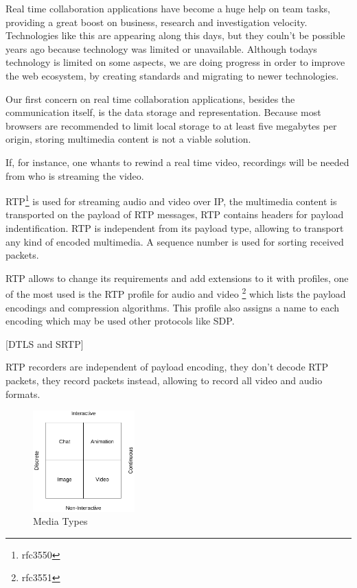 
 	Real time collaboration applications have become a huge help on team tasks, providing a great boost on business, research and investigation velocity. Technologies like this are appearing along this days, but they couln't be possible years ago because technology was limited or unavailable. Although todays technology is limited on some aspects, we are doing progress in order to improve the web ecosystem, by creating standards and migrating to newer technologies.

 	Our first concern on real time collaboration applications, besides the communication itself, is the data storage and representation. Because most browsers are recommended to limit local storage to at least five megabytes per origin, storing multimedia content is not a viable solution.

	If, for instance, one whants to rewind a real time video, recordings will be needed from who is streaming the video. 

  \ac{RTP}\footnote{rfc3550} is used for streaming audio and video over \ac{IP}, the multimedia content is transported on the payload of \ac{RTP} messages, \ac{RTP} contains headers for payload indentification. \ac{RTP} is independent from its payload type, allowing to transport any kind of encoded multimedia. A sequence number is used for sorting received packets.

  \ac{RTP} allows to change its requirements and add extensions to it with profiles, one of the most used is the \ac{RTP} profile for audio and video \footnote{rfc3551} which lists the payload encodings and compression algorithms. This profile also assigns a name to each encoding which may be used other protocols like \ac{SDP}.

  {\color{red}[DTLS and SRTP]}

  \ac{RTP} recorders are independent of payload encoding, they don't decode \ac{RTP} packets, they record packets instead, allowing to record all video and audio formats.

\begin{figure}[H]
	\begin{center}
		\centering
		\includegraphics[width=0.35\textwidth]{figures/media_types.png}

	\caption{Media Types}
	\end{center}
\end{figure}

